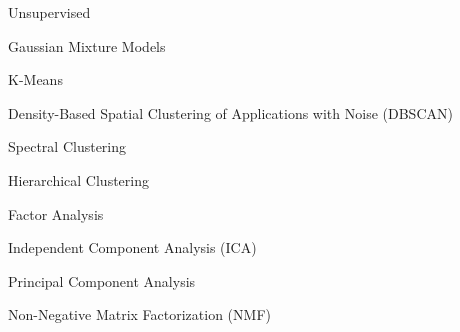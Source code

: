 \documentclass[11pt]{article}
\begin{document}
\begin{enumerate}
\begin{item}
\begin{enumerate}
\begin{item}
\begin{enumerate}
\begin{item}
                \end{item}

            \end{enumerate}


          \end{item}

          \begin{item}

            Unsupervised

            \begin{enumerate}

                \begin{item}
                  Gaussian Mixture Models
                \end{item}

                \begin{item}
                  K-Means
                \end{item}

                \begin{item}
                  Density-Based Spatial Clustering of Applications with Noise
                  (DBSCAN)
                \end{item}

                \begin{item}
                  Spectral Clustering
                \end{item}

                \begin{item}
                  Hierarchical Clustering
                \end{item}

                \begin{item}
                  Factor Analysis
                \end{item}

                \begin{item}
                  Independent Component Analysis (ICA)
                \end{item}

                \begin{item}
                  Principal Component Analysis
                \end{item}

                \begin{item}
                  Non-Negative Matrix Factorization (NMF)
                \end{item}


\end{enumerate}
\end{item}
\end{enumerate}
\end{item}
\end{enumerate}
\end{document}
